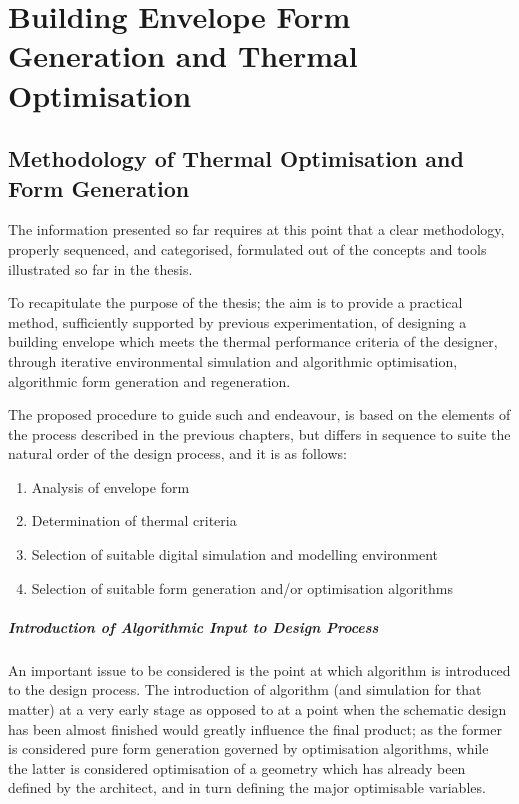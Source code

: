 \chapter{Building Envelope Form Generation and Thermal Optimisation}

\section{Methodology of Thermal Optimisation and Form Generation}

The information presented so far requires at this point that a clear methodology, properly sequenced, and categorised, formulated out of the concepts and tools illustrated so far in the thesis.

To recapitulate the purpose of the thesis; the aim is to provide a practical method, sufficiently supported by previous experimentation, of designing a building envelope which meets the thermal performance criteria of the designer, through iterative environmental simulation and algorithmic optimisation, algorithmic form generation and regeneration.

The proposed procedure to guide such and endeavour, is based on the elements of the process described in the previous chapters, but differs in sequence to suite the natural order of the design process, and it is as follows:

\begin{enumerate}
	\item Analysis of envelope form
	\item Determination of thermal criteria
	\item Selection of suitable digital simulation and modelling environment
	\item Selection of suitable form generation and/or optimisation algorithms
\end{enumerate}

\paragraph{Introduction of Algorithmic Input to Design Process} \mbox{}

An important issue to be considered is the point at which algorithm is introduced to the design process. The introduction of algorithm (and simulation for that matter) at a very early stage as opposed to at a point when the schematic design has been almost finished would greatly influence the final product; as the former is considered pure form generation governed by optimisation algorithms, while the latter is considered optimisation of a geometry which has already been defined by the architect, and in turn defining the major optimisable variables.

